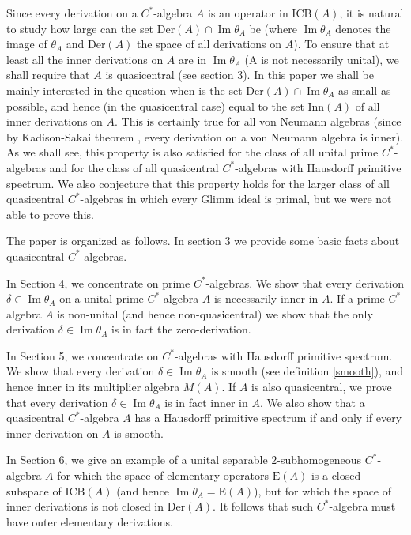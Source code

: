 \documentclass[]{amsart}
\theoremstyle{remark}
\theoremstyle{definition}
\theoremstyle{question}
\numberwithin{equation}{section}
\begin{document}
Since every derivation on a $C^*$-algebra $A$ is an operator in
$\mathrm{ICB}(A)$, it is natural to study how large can the set
$\mathrm{Der}(A) \cap {\mathop{\mathrm{Im}}} \theta_A$ be (where ${\mathop{\mathrm{Im}}} \theta_A$ denotes the image of
$\theta_A$ and $\mathrm{Der}(A)$ the space of all derivations on $A$).
To ensure that at least all the inner derivations on $A$ are in ${\mathop{\mathrm{Im}}}
\theta_A$ (A is not necessarily unital), we shall require that $A$ is quasicentral (see section 3). In this paper we shall be mainly interested in the question when is
the set $\mathrm{Der}(A) \cap {\mathop{\mathrm{Im}}} \theta_A$ as small as possible, and hence (in
the quasicentral case) equal to the set $\mathrm{Inn}(A)$ of all inner derivations
on $A$. This is certainly true for all von Neumann algebras (since by Kadison-Sakai theorem \cite[4.1.6]{Sak}, every derivation
on a von Neumann algebra is inner). As we shall see, this
property is also satisfied for the class of
all unital prime $C^*$-algebras and for the class of all quasicentral $C^*$-algebras with Hausdorff
primitive spectrum. We also conjecture that this property holds for the
larger class of all quasicentral $C^*$-algebras in which every Glimm ideal is primal, but we
were not able to prove this.

The paper is organized as follows. In section 3 we provide some basic facts
about quasicentral $C^*$-algebras.

In Section 4, we concentrate on prime $C^*$-algebras. We show that every
derivation $\delta \in {\mathop{\mathrm{Im}}} \theta_A$ on a unital prime $C^*$-algebra $A$ is
necessarily inner in $A$. If a prime $C^*$-algebra $A$ is non-unital (and hence
non-quasicentral) we show that the only derivation $\delta \in {\mathop{\mathrm{Im}}} \theta_A$ is in
fact the zero-derivation.

In Section 5, we concentrate on $C^*$-algebras with Hausdorff primitive
spectrum. We show that every derivation $\delta \in {\mathop{\mathrm{Im}}} \theta_A$ is smooth (see
definition \ref{smooth}), and hence inner in its multiplier algebra $M(A)$. If
$A$ is also quasicentral, we prove that every derivation $\delta \in {\mathop{\mathrm{Im}}} \theta_A$
is in fact inner in $A$. We also show that a quasicentral $C^*$-algebra $A$ has a
Hausdorff primitive spectrum if and only if every inner derivation on $A$ is
smooth.

In Section 6, we give an example of a unital separable $2$-subhomogeneous
$C^*$-algebra $A$ for which the space of elementary operators ${\mathrm{E}}(A)$
is a closed subspace of $\mathrm{ICB}(A)$ (and hence ${\mathop{\mathrm{Im}}} \theta_A={\mathrm{E}}(A)$), but
for which the space of inner derivations is not closed in $\mathrm{Der}(A)$. It
follows that such $C^*$-algebra must have outer elementary derivations.
\end{document}
